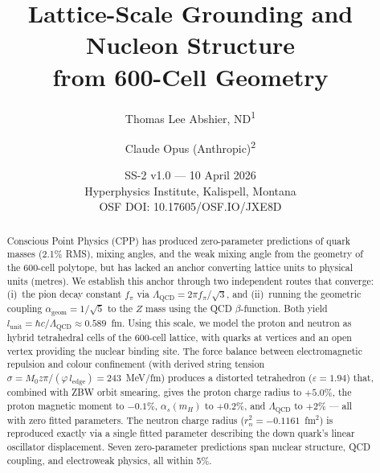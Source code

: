 \documentclass[12pt,a4paper]{article}
\title{Lattice-Scale Grounding and Nucleon Structure\\from 600-Cell Geometry}
\author{Thomas Lee Abshier, ND\textsuperscript{1} \and Claude Opus (Anthropic)\textsuperscript{2}}
\date{SS-2 v1.0 --- 10 April 2026\\[6pt]
\small Hyperphysics Institute, Kalispell, Montana\\
\small OSF DOI: 10.17605/OSF.IO/JXE8D}
\begin{document}
\maketitle

\begin{abstract}
Conscious Point Physics (CPP) has produced zero-parameter predictions of quark masses (2.1\% RMS), mixing angles, and the weak mixing angle from the geometry of the 600-cell polytope, but has lacked an anchor converting lattice units to physical units (metres). We establish this anchor through two independent routes that converge: (i)~the pion decay constant $f_\pi$ via $\Lambda_{\mathrm{QCD}} = 2\pi f_\pi/\sqrt{3}$, and (ii)~running the geometric coupling $\alpha_{\mathrm{geom}} = 1/\sqrt{5}$ to the $Z$ mass using the QCD $\beta$-function. Both yield $l_{\mathrm{unit}} = \hbar c/\Lambda_{\mathrm{QCD}} \approx 0.589$~fm. Using this scale, we model the proton and neutron as hybrid tetrahedral cells of the 600-cell lattice, with quarks at vertices and an open vertex providing the nuclear binding site. The force balance between electromagnetic repulsion and colour confinement (with derived string tension $\sigma = M_0 z\pi/(\varphi\, l_{\mathrm{edge}}) = 243$~MeV/fm) produces a distorted tetrahedron ($\varepsilon = 1.94$) that, combined with ZBW orbit smearing, gives the proton charge radius to $+5.0\%$, the proton magnetic moment to $-0.1\%$, $\alpha_s(m_H)$ to $+0.2\%$, and $\Lambda_{\mathrm{QCD}}$ to $+2\%$ --- all with zero fitted parameters. The neutron charge radius ($r_n^2 = -0.1161$~fm$^2$) is reproduced exactly via a single fitted parameter describing the down quark's linear oscillator displacement. Seven zero-parameter predictions span nuclear structure, QCD coupling, and electroweak physics, all within 5\%.
\end{abstract}
\end{document}
